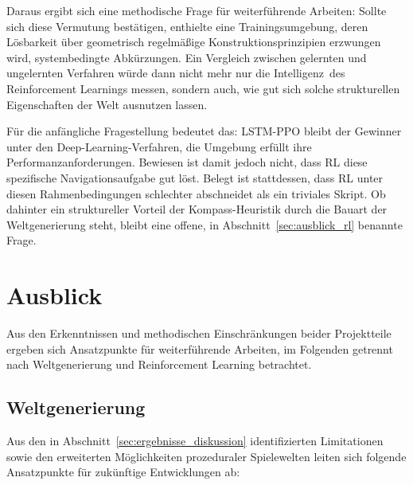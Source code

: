 \documentclass[
  a4paper,
  11pt,
  twoside,
  BCOR=8mm,           %
  headings=big,
  numbers=noenddot,
  listof=totoc,       %
  captions=tableheading,
]{scrreprt}
\begin{document}
Daraus ergibt sich eine methodische Frage für weiterführende Arbeiten: Sollte sich diese Vermutung bestätigen, enthielte eine Trainingsumgebung, deren Lösbarkeit über geometrisch regelmäßige Konstruktionsprinzipien erzwungen wird, systembedingte Abkürzungen. Ein Vergleich zwischen gelernten und ungelernten Verfahren würde dann nicht mehr nur die \glqq Intelligenz\grqq\ des Reinforcement Learnings messen, sondern auch, wie gut sich solche strukturellen Eigenschaften der Welt ausnutzen lassen.

Für die anfängliche Fragestellung bedeutet das: LSTM-PPO bleibt der Gewinner unter den Deep-Learning-Verfahren, die Umgebung erfüllt ihre Performanzanforderungen. Bewiesen ist damit jedoch nicht, dass RL diese spezifische Navigationsaufgabe gut löst. Belegt ist stattdessen, dass RL unter diesen Rahmenbedingungen schlechter abschneidet als ein triviales Skript. Ob dahinter ein struktureller Vorteil der Kompass-Heuristik durch die Bauart der Weltgenerierung steht, bleibt eine offene, in Abschnitt~\ref{sec:ausblick_rl} benannte Frage.

\section{Ausblick}
\label{sec:fazit_ausblick}
Aus den Erkenntnissen und methodischen Einschränkungen beider Projektteile ergeben sich Ansatzpunkte für weiterführende Arbeiten, im Folgenden getrennt nach Weltgenerierung und Reinforcement Learning betrachtet.

\subsection{Weltgenerierung}
\label{sec:ausblick_weltgenerierung}
Aus den in Abschnitt~\ref{sec:ergebnisse_diskussion} identifizierten Limitationen sowie den erweiterten Möglichkeiten prozeduraler Spielewelten leiten sich folgende Ansatzpunkte für zukünftige Entwicklungen ab:
\end{document}
